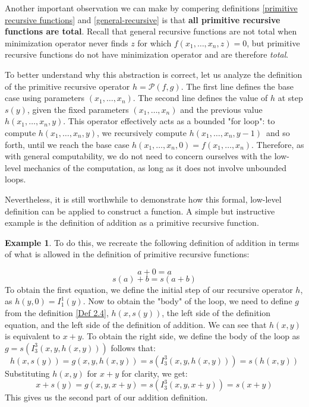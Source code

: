 \documentclass{pracalicmgr2025}
\theoremstyle{plain}            %
\theoremstyle{remark}           %
\theoremstyle{definition}       %
\newtheorem{example}[theorem]{Example}
\begin{document}
Another important observation we can make by compering definitions \ref{primitive recursive functions} and \ref{general-recursive} is that \textbf{all primitive recursive functions are total}. Recall that general recursive functions are not total when minimization operator never finds $z$ for which $f(x_1,\dots,x_n,z) = 0$, but primitive recursive functions do not have minimization operator and are therefore \textit{total}.


To better understand why this abstraction is correct, let us analyze the definition of the primitive recursive operator $h = \mathcal{P}(f, g)$. The first line defines the base case using parameters $(x_1, \dots, x_n)$. The second line defines the value of $h$ at step $s(y)$, given the fixed parameters $(x_1, \dots, x_n)$ and the previous value $h(x_1, \dots, x_n, y)$. This operator effectively acts as a bounded "for loop": to compute $h(x_1, \dots, x_n, y)$, we recursively compute $h(x_1, \dots, x_n, \mbox{$y-1$})$\, and so forth, until we reach the base case $h(x_1,\dots,x_n,0) = f(x_1,\dots,x_n)$. Therefore, as with general computability, we do not need to concern ourselves with the low-level mechanics of the computation, as long as it does not involve unbounded loops.

Nevertheless, it is still worthwhile to demonstrate how this formal, low-level definition can be applied to construct a function. A simple but instructive example is the definition of addition as a primitive recursive function.

\begin{example}
To do this, we recreate the following definition of addition in terms of what is allowed in the definition of primitive recursive functions:

$$a+0 = a$$
$$s(a)+b = s(a+b)$$
To obtain the first equation, we define the initial step of our recursive operator $h$, as $h(y,0) = I^1_1(y)$. Now to obtain the "body" of the loop, we need to define $g$ from the definition \ref{Def 2.4},  $h(x,s(y))$, the left side of the definition equation, and the left side of the definition of addition. We can see that $h(x,y)$ is equivalent to $x+y$. To obtain the right side, we define the body of the loop as $g = s(I^3_3(x,y,h(x,y)))$ follows that:
$$h(x,s(y)) = g(x,y,h(x,y)) = s(I^3_3(x,y,h(x,y))) = s(h(x,y))$$
Substituting $h(x,y)$ for $x+y$ for clarity, we get:
$$x+s(y)=g(x,y,x+y)=s(I^3_3(x,y,x+y))=s(x+y)$$
This gives us the second part of our addition definition. 
\end{example}
\end{document}
